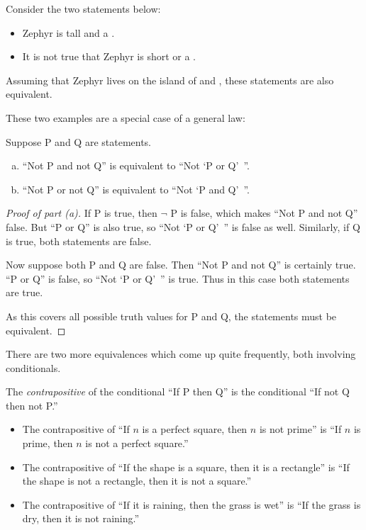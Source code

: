 \documentclass{tufte-book}
\begin{document}
\begin{example}
  Consider the two statements below:
  \begin{itemize}
      \item Zephyr is tall and a \knave.
      \item It is not true that Zephyr is short or a \knight.
  \end{itemize}
  Assuming that Zephyr lives on the island of \knights and \knaves, these statements are also equivalent.
\end{example}

These two examples are a special case of a general law:
\begin{theorem}
  Suppose P and Q are statements.
  \begin{enumerate}[(a)]
      \item ``Not P and not Q'' is equivalent to ``Not `P or Q'~''.
      \item ``Not P or not Q'' is equivalent to ``Not `P and Q'~''.
  \end{enumerate}
\end{theorem}

\begin{proof}[Proof of part (a)]
  If P is true, then $\neg$ P is false, which makes ``Not P and not Q'' false. But ``P or Q'' is also true, so ``Not `P or Q'~'' is false as well. Similarly, if Q is true, both statements are false.

  Now suppose both P and Q are false. Then ``Not P and not Q'' is certainly true. ``P or Q'' is false, so ``Not `P or Q'~'' is true. Thus in this case both statements are true.

  As this covers all possible truth values for P and Q, the statements must be equivalent.
\end{proof}

There are two more equivalences which come up quite frequently, both involving conditionals.

\begin{definition}
  The \emph{contrapositive} of the conditional ``If P then Q'' is the conditional ``If not Q then not P.''
\end{definition}

\begin{example}
  \begin{itemize}
      \item The contrapositive of ``If $n$ is a perfect square, then $n$ is not prime'' is ``If $n$ is prime, then $n$ is not a perfect square.''
      \item The contrapositive of ``If the shape is a square, then it is a rectangle'' is ``If the shape is not a rectangle, then it is not a square.''
      \item The contrapositive of ``If it is raining, then the grass is wet'' is ``If the grass is dry, then it is not raining.''
  \end{itemize}
\end{example}
\end{document}
